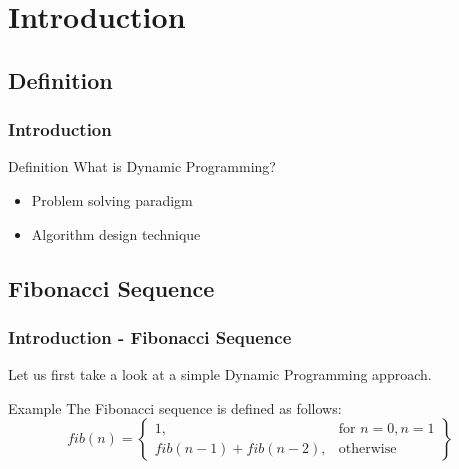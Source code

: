 \section{Introduction}
\subsection{Definition}

\begin{frame}
  \frametitle{Introduction}
  \begin{block}{Definition}
   What is Dynamic Programming?
   \begin{itemize}
     \item Problem solving paradigm
     \item Algorithm design technique
   \end{itemize}
  \end{block}
\end{frame}



\subsection{Fibonacci Sequence}
\begin{frame}
  \frametitle{Introduction - Fibonacci Sequence}
  Let us first take a look at a simple Dynamic Programming approach.

  \begin{block}{Example}
    The Fibonacci sequence is defined as follows:
    \\
    \[
    fib(n) = \left\{\begin{array}{lr}
      1, & \text{for } n = 0, n = 1\\
      fib(n-1) + fib(n-2), & \text{otherwise}
      \end{array}\right\}
    \]
    \\
  \end{block}
\end{frame}



